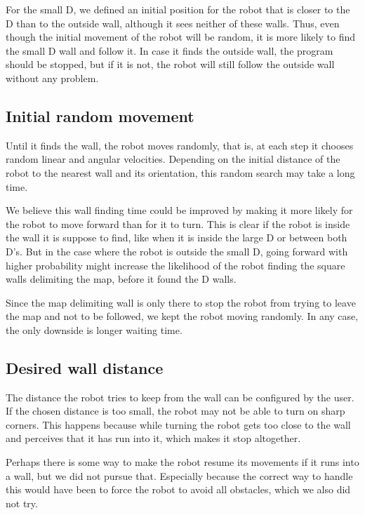 \documentclass[12pt,a4paper,reqno]{article}
\numberwithin{figure}{section}
\numberwithin{equation}{section}
\begin{document}
For the small D, we defined an initial position for the robot that is closer to the D than to the outside wall, although it sees neither of these walls. Thus, even though the initial movement of the robot will be random, it is more likely to find the small D wall and follow it. In case it finds the outside wall, the program should be stopped, but if it is not, the robot will still follow the outside wall without any problem.

\subsection{Initial random movement}

Until it finds the wall, the robot moves randomly, that is, at each step it chooses random linear and angular velocities. Depending on the initial distance of the robot to the nearest wall and its orientation, this random search may take a long time. 

We believe this wall finding time could be improved by making it more likely for the robot to move forward than for it to turn. This is clear if the robot is inside the wall it is suppose to find, like when it is inside the large D or between both D's. But in the case where the robot is outside the small D, going forward with higher probability might increase the likelihood of the robot finding the square walls delimiting the map, before it found the D walls.

Since the map delimiting wall is only there to stop the robot from trying to leave the map and not to be followed, we kept the robot moving randomly. In any case, the only downside is longer waiting time.

\subsection{Desired wall distance}

The distance the robot tries to keep from the wall can be configured by the user. If the chosen distance is too small, the robot may not be able to turn on sharp corners. This happens because while turning the robot gets too close to the wall and perceives that it has run into it, which makes it stop altogether.

Perhaps there is some way to make the robot resume its movements if it runs into a wall, but we did not pursue that. Especially because the correct way to handle this would have been to force the robot to avoid all obstacles, which we also did not try.
\end{document}

